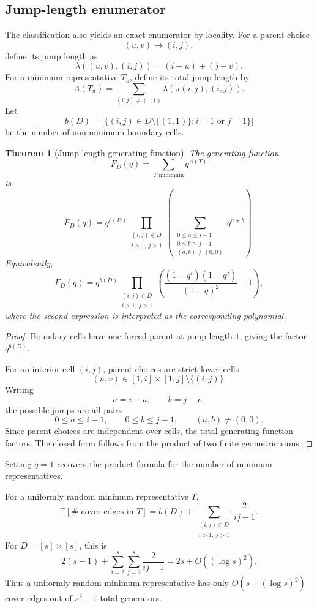 \documentclass[11pt]{article}
\newtheorem{theorem}{Theorem}[section]
\begin{document}
\subsection{Jump-length enumerator}

The classification also yields an exact enumerator by locality. For a parent choice
\[
(u,v)\to(i,j),
\]
define its jump length as
\[
\lambda((u,v),(i,j))=(i-u)+(j-v).
\]
For a minimum representative $T_\pi$, define its total jump length by
\[
\Lambda(T_\pi)
=
\sum_{(i,j)\ne(1,1)}
\lambda(\pi(i,j),(i,j)).
\]
Let
\[
b(D)=|\{(i,j)\in D\setminus\{(1,1)\}:i=1\text{ or }j=1\}|
\]
be the number of non-minimum boundary cells.

\begin{theorem}[Jump-length generating function]
The generating function
\[
F_D(q)=\sum_{T\text{ minimum}}q^{\Lambda(T)}
\]
is
\[
F_D(q)
=
q^{b(D)}
\prod_{\substack{(i,j)\in D\\ i>1,\ j>1}}
\left(
\sum_{\substack{0\le a\le i-1\\ 0\le b\le j-1\\ (a,b)\ne(0,0)}}
q^{a+b}
\right).
\]
Equivalently,
\[
F_D(q)
=
q^{b(D)}
\prod_{\substack{(i,j)\in D\\ i>1,\ j>1}}
\left(
\frac{(1-q^i)(1-q^j)}{(1-q)^2}-1
\right),
\]
where the second expression is interpreted as the corresponding polynomial.
\end{theorem}

\begin{proof}
Boundary cells have one forced parent at jump length $1$, giving the factor $q^{b(D)}$.

For an interior cell $(i,j)$, parent choices are strict lower cells
\[
(u,v)\in[1,i]\times[1,j]\setminus\{(i,j)\}.
\]
Writing
\[
a=i-u,\qquad b=j-v,
\]
the possible jumps are all pairs
\[
0\le a\le i-1,\qquad
0\le b\le j-1,\qquad
(a,b)\ne(0,0).
\]
Since parent choices are independent over cells, the total generating function factors. The closed form follows from the product of two finite geometric sums.
\end{proof}

Setting $q=1$ recovers the product formula for the number of minimum representatives.

For a uniformly random minimum representative $T$,
\[
\mathbb E[\#\text{ cover edges in }T]
=
b(D)
+
\sum_{\substack{(i,j)\in D\\ i>1,\ j>1}}
\frac{2}{ij-1}.
\]
For $D=[s]\times[s]$, this is
\[
2(s-1)+\sum_{i=2}^{s}\sum_{j=2}^{s}\frac{2}{ij-1}
=
2s+O((\log s)^2).
\]
Thus a uniformly random minimum representative has only $O(s+(\log s)^2)$ cover edges out of $s^2-1$ total generators.
\end{document}
